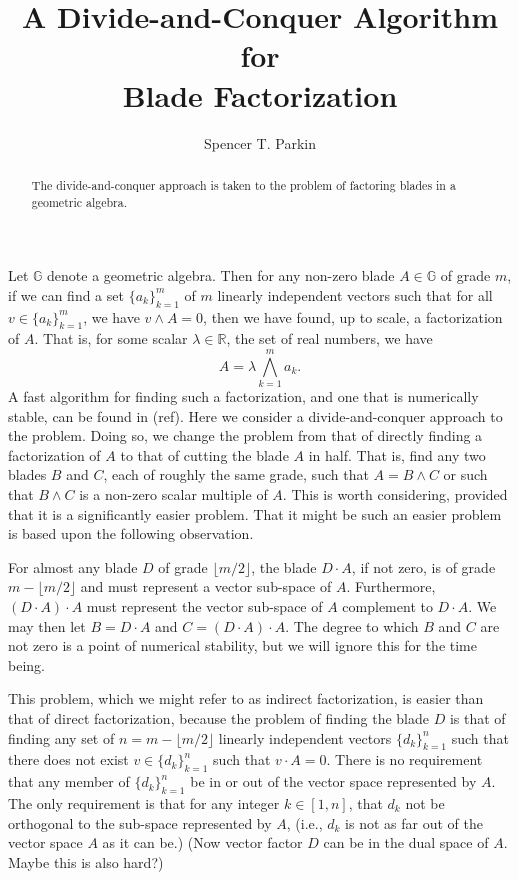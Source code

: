 \documentclass[12pt]{article}
\title{A Divide-and-Conquer Algorithm\\for\\Blade Factorization}
\author{Spencer T. Parkin}
\newcommand{\G}{\mathbb{G}}
\newcommand{\R}{\mathbb{R}}
\begin{document}
\maketitle

\begin{abstract}
The divide-and-conquer approach is taken to the problem of factoring blades in a geometric algebra.
\end{abstract}

Let $\G$ denote a geometric algebra.  Then for any non-zero blade $A\in\G$ of grade $m$, if we can
find a set $\{a_k\}_{k=1}^m$ of $m$ linearly independent vectors such that for all $v\in\{a_k\}_{k=1}^m$,
we have $v\wedge A=0$, then we have found, up to scale, a factorization of $A$.  That is, for some
scalar $\lambda\in\R$, the set of real numbers, we have
\begin{equation*}
A = \lambda\bigwedge_{k=1}^m a_k.
\end{equation*}
A fast algorithm for finding such a factorization, and one that is numerically stable, can be
found in (ref).  Here we consider a divide-and-conquer approach to the problem.  Doing so, we
change the problem from that of directly finding a factorization of $A$ to that of cutting the blade $A$ in
half.  That is, find any two blades $B$ and $C$, each of roughly the same grade, such that $A=B\wedge C$ or such
that $B\wedge C$ is a non-zero scalar multiple of $A$.
This is worth considering, provided that it is a significantly easier problem.  That it might be such an easier
problem is based upon the following observation.

For almost any blade $D$ of grade $\lfloor m/2\rfloor$, the
blade $D\cdot A$, if not zero, is of grade $m-\lfloor m/2\rfloor$ and must represent a vector sub-space of $A$.  Furthermore,
$(D\cdot A)\cdot A$ must represent the vector sub-space of $A$ complement to $D\cdot A$.  We may
then let $B=D\cdot A$ and $C=(D\cdot A)\cdot A$.
The degree to which $B$ and $C$ are not zero is a point of numerical stability, but we will
ignore this for the time being.

This problem, which we might refer to as indirect factorization, is easier than that of direct factorization,
because the problem of finding the blade $D$ is that of
finding any set of $n=m-\lfloor m/2\rfloor$ linearly independent vectors $\{d_k\}_{k=1}^n$ such that there does not exist $v\in\{d_k\}_{k=1}^n$
such that $v\cdot A=0$.  There is no requirement that any member of $\{d_k\}_{k=1}^n$ be in or out of the vector space represented by $A$.
The only requirement is that for any integer $k\in[1,n]$, that $d_k$ not be orthogonal to the sub-space represented by $A$, (i.e., $d_k$ is
not as far out of the vector space $A$ as it can be.)  (Now vector factor $D$ can be in the dual space of $A$.  Maybe this is also hard?)
\end{document}
